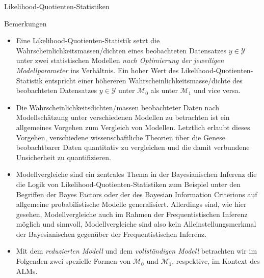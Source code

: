 \documentclass[
  8pt,
  ignorenonframetext,
]{beamer}
\begin{document}
\begin{frame}{Likelihood-Quotienten-Statistiken}
\protect\hypertarget{likelihood-quotienten-statistiken-1}{}
\footnotesize

Bemerkungen

\begin{itemize}
\item
  \justifying Eine Likelihood-Quotienten-Statistik setzt die
  Wahrscheinlichkeitsmassen/dichten eines beobachteten Datensatzes
  \(y \in \mathcal{Y}\) unter zwei statistischen Modellen \emph{nach
  Optimierung der jeweiligen Modellparameter} ins Verhältnis. Ein hoher
  Wert des Likelihood-Quotienten-Statistik entspricht einer höhereren
  Wahrscheinlichkeitsmasse/dichte des beobachteten Datensatzes
  \(y \in \mathcal{Y}\) unter \(\mathcal{M}_0\) als unter
  \(\mathcal{M}_1\) und vice versa.
\item
  \justifying  Die Wahrscheinlichkeitsdichten/massen beobachteter Daten
  nach Modellschätzung unter verschiedenen Modellen zu betrachten ist
  ein allgemeines Vorgehen zum Vergleich von Modellen. Letztlich erlaubt
  dieses Vorgehen, verschiedene wissenschaftliche Theorien über die
  Genese beobachtbarer Daten quantitativ zu vergleichen und die damit
  verbundene Unsicherheit zu quantifizieren.
\item
  \justifying  Modellvergleiche sind ein zentrales Thema in der
  Bayesianischen Inferenz die die Logik von
  Likelihood-Quotienten-Statistiken zum Beispiel unter den Begriffen der
  Bayes Factors oder der des Bayesian Information Criterions auf
  allgemeine probabilistische Modelle generalisiert. Allerdings sind,
  wie hier gesehen, Modellvergleiche auch im Rahmen der
  Frequentistischen Inferenz möglich und sinnvoll, Modellvergleiche sind
  also kein Alleinstellungsmerkmal der Bayesianischen gegenüber der
  Frequentistischen Inferenz.
\item
  Mit dem \emph{reduzierten Modell} und dem \emph{vollständigen Modell}
  betrachten wir im Folgenden zwei spezielle Formen von
  \(\mathcal{M}_0\) und \(\mathcal{M}_1\), respektive, im Kontext des
  ALMs.
\end{itemize}
\end{frame}
\end{document}
